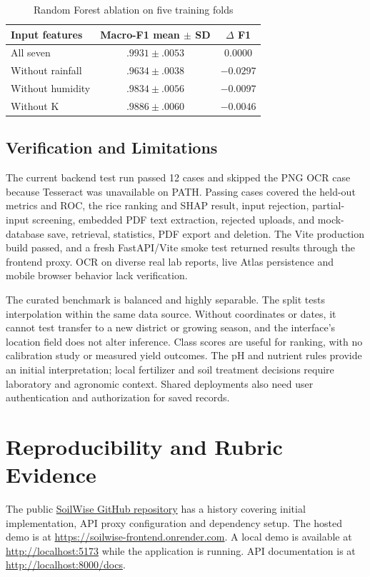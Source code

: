 \documentclass[conference]{IEEEtran}
\begin{document}
\begin{table}[t]
\caption{Random Forest ablation on five training folds}
\label{tab:ablation}
\centering\footnotesize
\begin{tabular}{@{}lcc@{}}
\toprule
Input features & Macro-F1 mean $\pm$ SD & $\Delta$ F1 \\
\midrule
All seven & $.9931\pm.0053$ & 0.0000 \\
Without rainfall & $.9634\pm.0038$ & $-0.0297$ \\
Without humidity & $.9834\pm.0056$ & $-0.0097$ \\
Without K & $.9886\pm.0060$ & $-0.0046$ \\
\bottomrule
\end{tabular}
\end{table}

\subsection{Verification and Limitations}
The current backend test run passed 12 cases and skipped the PNG OCR case because Tesseract was unavailable on PATH. Passing cases covered the held-out metrics and ROC, the rice ranking and SHAP result, input rejection, partial-input screening, embedded PDF text extraction, rejected uploads, and mock-database save, retrieval, statistics, PDF export and deletion. The Vite production build passed, and a fresh FastAPI/Vite smoke test returned results through the frontend proxy. OCR on diverse real lab reports, live Atlas persistence and mobile browser behavior lack verification.

The curated benchmark is balanced and highly separable. The split tests interpolation within the same data source. Without coordinates or dates, it cannot test transfer to a new district or growing season, and the interface's location field does not alter inference. Class scores are useful for ranking, with no calibration study or measured yield outcomes. The pH and nutrient rules provide an initial interpretation; local fertilizer and soil treatment decisions require laboratory and agronomic context. Shared deployments also need user authentication and authorization for saved records.

\section{Reproducibility and Rubric Evidence}
The public \href{https://github.com/hari-02006/soilwise-backend}{SoilWise GitHub repository} has a history covering initial implementation, API proxy configuration and dependency setup. The hosted demo is at \url{https://soilwise-frontend.onrender.com}. A local demo is available at \url{http://localhost:5173} while the application is running. API documentation is at \url{http://localhost:8000/docs}.
\end{document}
